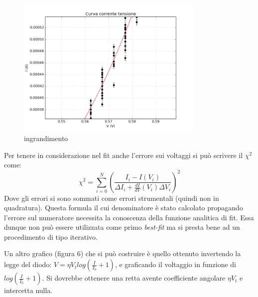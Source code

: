 \documentclass[a4paper,10pt]{article}
\begin{document}
\begin{figure}[!htb]
\begin{center}
\includegraphics[width=0.8\textwidth]{digitalizzatore.png}
\end{center}
\caption{ingrandimento}
\end{figure}

Per tenere in considerazione nel fit anche l'errore sui voltaggi si può scrivere il $\chi^2$ come:
\begin{equation}
\chi^2 = \sum_{i=0}^N \left( \frac{I_i - I(V_i)}{\Delta I_i + \frac{dI}{dV}(V_i) \Delta V_i} \right) ^2
\end{equation}
Dove gli errori si sono sommati come errori strumentali (quindi non in quadratura). 
Questa formula il cui denominatore è stato calcolato propagando l'errore sul numeratore necessita la conoscenza della funzione analitica di fit. Essa dunque non può essere utilizzata come primo \emph{best-fit} ma si presta bene ad un procedimento di tipo iterativo.


Un altro grafico (figura 6) che si può costruire è quello ottenuto invertendo la legge del diodo: $V = \eta V_t log(\frac{I}{I_0} + 1)$, e graficando  il voltaggio in funzione di $log(\frac{I}{I_0} + 1)$. Si dovrebbe ottenere una retta avente coefficiente angolare $\eta V_t$ e intercetta nulla.
\end{document}
